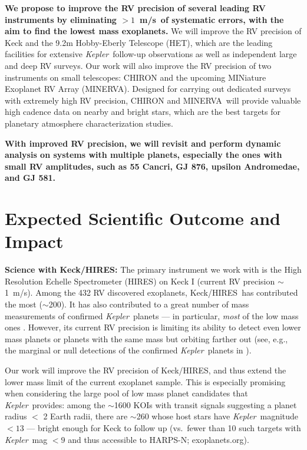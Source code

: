 \documentclass[12pt]{article}
\def\mps{m/s}
\def\kepler{{\it Kepler}}
\def\minerva{MINERVA}
\def\keck{Keck/HIRES}
\begin{document}
\textbf{We propose to improve the RV precision of several leading RV
  instruments by eliminating $>1$~\mps\ of systematic errors, with the
  aim to find the lowest mass exoplanets.} We will improve the RV
precision of Keck and the 9.2m Hobby-Eberly Telescope (HET), which are
the leading facilities for extensive \kepler\ follow-up observations
as well as independent large and deep RV surveys. Our work will also
improve the RV precision of two instruments on small telescopes:
CHIRON and the upcoming MINiature Exoplanet RV Array
(\minerva). Designed for carrying out dedicated surveys with extremely
high RV precision, CHIRON and \minerva\ will provide valuable high
cadence data on nearby and bright stars, which are the best targets
for planetary atmosphere characterization studies.

\textbf{With improved RV precision, we will revisit and perform
  dynamic analysis on systems with multiple planets, especially the
  ones with small RV amplitudes, such as 55 Cancri, GJ 876, upsilon
  Andromedae, and GJ 581.}


\vspace{-10pt}
\section{Expected Scientific Outcome and Impact}
\vspace{-5pt}
\textbf{Science with \keck: } The primary instrument we work with is
the High Resolution Echelle Spectrometer (HIRES) on Keck I (current RV
precision $\sim$1~\mps). Among the 432 RV discovered exoplanets,
\keck\ has contributed the most ($\sim$200). It has also contributed
to a great number of mass measurements of confirmed \kepler\ planets
--- in particular, \textit{most} of the low mass ones
\citep[e.g.,][]{gautier2012,gilliland2013,howard2013,marcy2014}. However,
its current RV precision is limiting its ability to detect even lower
mass planets or planets with the same mass but orbiting farther out
(see, e.g., the marginal or null detections of the confirmed
\kepler\ planets in \citealt{marcy2014}).

Our work will improve the RV precision of \keck, and thus extend the
lower mass limit of the current exoplanet sample. This is especially
promising when considering the large pool of low mass planet
candidates that \kepler\ provides: among the $\sim$1600 KOIs with
transit signals suggesting a planet radius $<$ 2 Earth radii, there
are $\sim$260 whose host stars have \kepler\ magnitude $< 13$ ---
bright enough for Keck to follow up (vs.~fewer than 10 such targets
with \kepler\ mag $< 9$ and thus accessible to HARPS-N; exoplanets.org).
\end{document}
